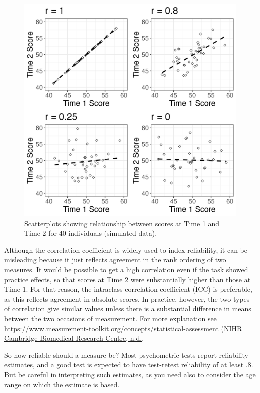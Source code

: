 \documentclass{krantz}
\begin{document}
\begin{figure}
\includegraphics[width=0.8\linewidth]{images_bw/correlationfig} \caption{Scatterplots showing relationship between scores at Time 1 and Time 2 for 40 individuals (simulated data).}\label{fig:correlationfig}
\end{figure}

\begin{tcolorbox}[colback=Black!5!lightgray,colframe=black!75!black,coltitle=white,title=Correlation as an index of reliability]\label{box:correlation}

Although the correlation coefficient is widely used to index reliability, it can be misleading because it just reflects agreement in the rank ordering of two measures. It would be possible to get a high correlation even if the task showed practice effects, so that scores at Time 2 were substantially higher than those at Time 1. For that reason, the intraclass correlation coefficient (ICC) is preferable, as this reflects agreement in absolute scores. In practice, however, the two types of correlation give similar values unless there is a substantial difference in means between the two occasions of measurement. For more explanation see  https://www.measurement-toolkit.org/concepts/statistical-assessment (\protect\hyperlink{ref-nihrcam}{NIHR Cambridge Biomedical Research Centre, n.d.}.
\end{tcolorbox}

 
So how reliable should a measure be? Most psychometric tests report reliability estimates, and a good test is expected to have test-retest reliability of at least .8. But be careful in interpreting such estimates, as you need also to consider the age range on which the estimate is based.
\end{document}
